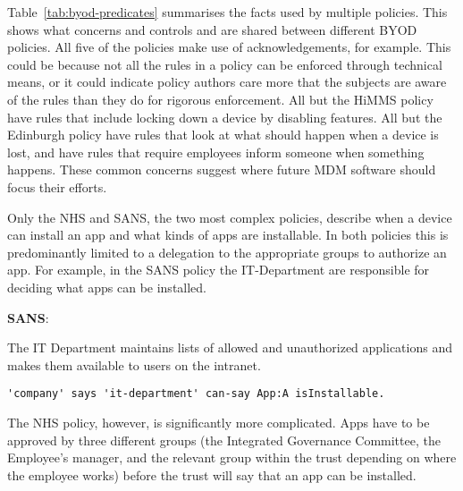 \documentclass{easychair}
\newenvironment{policyrule}[1]{%
  \begin{mdframed}\footnotesize
      \noindent\textbf{\sffamily #1}:~\itshape%
}{%
  \end{mdframed}
}
\begin{document}
Table~\ref{tab:byod-predicates} summarises the facts used by multiple policies.
This shows what concerns and controls and are shared between different BYOD policies.
All five of the policies make use of acknowledgements, for example.
This could be because not all the rules in a policy can be enforced through technical means, 
  or it could indicate policy authors care more that the subjects are aware of the rules than they do for rigorous enforcement.
All but the HiMMS policy have rules that include locking down a device by disabling features.
All but the Edinburgh policy have rules that look at what should happen when a device is lost,
  and have rules that require employees inform someone when something happens.
These common concerns suggest where future \ac{MDM} software should focus their efforts.

Only the NHS and SANS, the two most complex policies, describe when a device can install an app and what kinds of apps are installable.
In both policies this is predominantly limited to a delegation to the appropriate groups to authorize an app.
For example, in the SANS policy the IT-Department are responsible for deciding what apps can be installed.
\begin{policyrule}{SANS}
  The IT Department maintains lists of allowed and unauthorized applications and makes them available to users on the intranet.
  \normalfont
  \begin{lstlisting}
'company' says 'it-department' can-say App:A isInstallable.
  \end{lstlisting}
\end{policyrule}
The NHS policy, however, is significantly more complicated.
Apps have to be approved by three different groups (the Integrated Governance Committee, the Employee's manager, and the relevant group within the trust depending on where the employee works) before the trust will say that an app can be installed.
\end{document}
